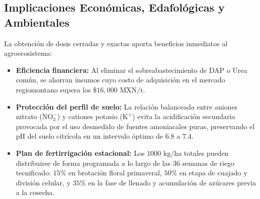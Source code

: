 \subsection{Implicaciones Económicas, Edafológicas y Ambientales}

La obtención de dosis cerradas y exactas aporta beneficios inmediatos al agroecosistema:

\begin{itemize}

    \item \textbf{Eficiencia financiera:} Al eliminar el sobreabastecimiento de DAP o Urea común, se ahorran insumos cuyo costo de adquisición en el mercado regiomontano supera los $\$16,000\text{ MXN/t}$.

    \item \textbf{Protección del perfil de suelo:} La relación balanceada entre aniones nitrato ($\text{NO}_3^-$) y cationes potasio ($\text{K}^+$) evita la acidificación secundaria provocada por el uso desmedido de fuentes amoniacales puras, preservando el pH del suelo citrícola en un intervalo óptimo de $6.8$ a $7.4$.

    \item \textbf{Plan de fertirrigación estacional:} Los $1000\text{ kg/ha}$ totales pueden distribuirse de forma programada a lo largo de las 36 semanas de riego tecnificado: $15\%$ en brotación floral primaveral, $50\%$ en etapa de cuajado y división celular, y $35\%$ en la fase de llenado y acumulación de azúcares previa a la cosecha.

\end{itemize}

\clearpage

